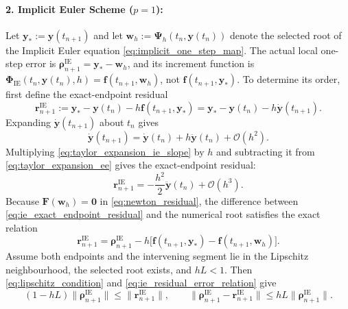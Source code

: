 \paragraph{2. Implicit Euler Scheme ($p=1$):}
Let $\mathbf y_*:=\mathbf y(t_{n+1})$ and let $\mathbf w_h:=\boldsymbol\Psi_h(t_n,\mathbf y(t_n))$ denote the selected root of the Implicit Euler equation \eqref{eq:implicit_one_step_map}. The actual local one-step error is $\boldsymbol\rho_{n+1}^{\mathrm{IE}}=\mathbf y_*-\mathbf w_h$, and its increment function is $\boldsymbol\Phi_{\mathrm{IE}}(t_n,\mathbf y(t_n),h)=\mathbf f(t_{n+1},\mathbf w_h)$, not $\mathbf f(t_{n+1},\mathbf y_*)$. To determine its order, first define the exact-endpoint residual
\begin{equation}
\label{eq:ie_exact_endpoint_residual}
\mathbf r_{n+1}^{\mathrm{IE}}
:=\mathbf y_*-\mathbf y(t_n)-h\mathbf f(t_{n+1},\mathbf y_*)
=\mathbf y_*-\mathbf y(t_n)-h\dot{\mathbf y}(t_{n+1}).
\end{equation}
Expanding $\dot{\mathbf{y}}(t_{n+1})$ about $t_n$ gives
\begin{equation}
\label{eq:taylor_expansion_ie_slope}
\dot{\mathbf{y}}(t_{n+1}) = \dot{\mathbf{y}}(t_n) + h \ddot{\mathbf{y}}(t_n) + \mathcal{O}(h^2).
\end{equation}
Multiplying \eqref{eq:taylor_expansion_ie_slope} by $h$ and subtracting it from \eqref{eq:taylor_expansion_ee} gives the exact-endpoint residual:
\begin{equation}
\label{eq:ie_residual_expansion}
\mathbf r_{n+1}^{\mathrm{IE}}
=-\frac{h^2}{2}\ddot{\mathbf y}(t_n)+\mathcal{O}(h^3).
\end{equation}
Because $\mathbf F(\mathbf w_h)=\mathbf0$ in \eqref{eq:newton_residual}, the difference between \eqref{eq:ie_exact_endpoint_residual} and the numerical root satisfies the exact relation
\begin{equation}
\label{eq:ie_residual_error_relation}
\mathbf r_{n+1}^{\mathrm{IE}}
=\boldsymbol\rho_{n+1}^{\mathrm{IE}}
-h\bigl[\mathbf f(t_{n+1},\mathbf y_*)-\mathbf f(t_{n+1},\mathbf w_h)\bigr].
\end{equation}
Assume both endpoints and the intervening segment lie in the Lipschitz neighbourhood, the selected root exists, and $hL<1$. Then \eqref{eq:lipschitz_condition} and \eqref{eq:ie_residual_error_relation} give
\begin{equation}
\label{eq:ie_residual_error_bound}
(1-hL)\|\boldsymbol\rho_{n+1}^{\mathrm{IE}}\|
\le \|\mathbf r_{n+1}^{\mathrm{IE}}\|,
\qquad
\|\boldsymbol\rho_{n+1}^{\mathrm{IE}}-\mathbf r_{n+1}^{\mathrm{IE}}\|
\le hL\|\boldsymbol\rho_{n+1}^{\mathrm{IE}}\|.
\end{equation}
